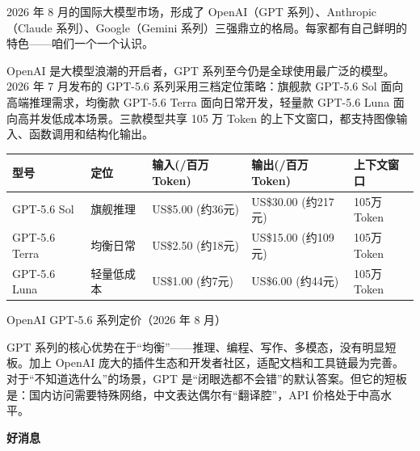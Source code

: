 


2026 年 8 月的国际大模型市场，形成了 OpenAI（GPT 系列）、Anthropic（Claude 系列）、Google（Gemini 系列）三强鼎立的格局。每家都有自己鲜明的特色——咱们一个一个认识。


OpenAI 是大模型浪潮的开启者，GPT 系列至今仍是全球使用最广泛的模型。2026 年 7 月发布的 GPT-5.6 系列采用三档定位策略：旗舰款 GPT-5.6 Sol 面向高端推理需求，均衡款 GPT-5.6 Terra 面向日常开发，轻量款 GPT-5.6 Luna 面向高并发低成本场景。三款模型共享 105 万 Token 的上下文窗口，都支持图像输入、函数调用和结构化输出。

\begin{center}
\begin{tabularx}{\linewidth}{|X|X|X|X|X|}
\hline
\textbf{型号} & \textbf{定位} & \textbf{输入(/百万Token)} & \textbf{输出(/百万Token)} & \textbf{上下文窗口} \tabularnewline
\hline
GPT-5.6 Sol & 旗舰推理 & US\$5.00 (约36元) & US\$30.00 (约217元) & 105万Token \tabularnewline
GPT-5.6 Terra & 均衡日常 & US\$2.50 (约18元) & US\$15.00 (约109元) & 105万Token \tabularnewline
GPT-5.6 Luna & 轻量低成本 & US\$1.00 (约7元) & US\$6.00 (约44元) & 105万Token \tabularnewline
\hline
\end{tabularx}
\end{center}

\begin{center}\small\color{gray}OpenAI GPT-5.6 系列定价（2026 年 8 月）\end{center}

GPT 系列的核心优势在于“均衡”——推理、编程、写作、多模态，没有明显短板。加上 OpenAI 庞大的插件生态和开发者社区，适配文档和工具链最为完善。对于“不知道选什么”的场景，GPT 是“闭眼选都不会错”的默认答案。但它的短板是：国内访问需要特殊网络，中文表达偶尔有“翻译腔”，API 价格处于中高水平。

\textbf{好消息}\par

